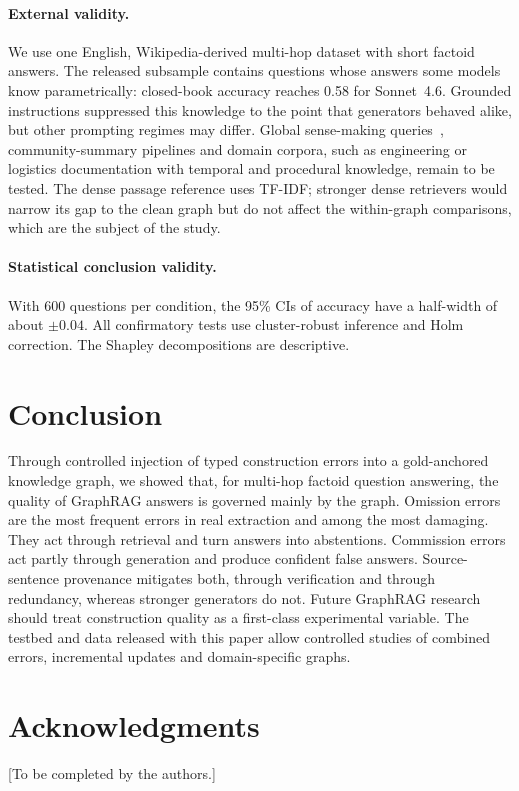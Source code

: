 \documentclass[11pt]{article}
\begin{document}
\paragraph{External validity.} We use one English, Wikipedia-derived multi-hop dataset with short factoid answers. The released subsample contains questions whose answers some models know parametrically: closed-book accuracy reaches 0.58 for Sonnet~4.6. Grounded instructions suppressed this knowledge to the point that generators behaved alike, but other prompting regimes may differ. Global sense-making queries~\cite{edge2024local}, community-summary pipelines and domain corpora, such as engineering or logistics documentation with temporal and procedural knowledge, remain to be tested. The dense passage reference uses TF-IDF; stronger dense retrievers would narrow its gap to the clean graph but do not affect the within-graph comparisons, which are the subject of the study.

\paragraph{Statistical conclusion validity.} With 600 questions per condition, the 95\% CIs of accuracy have a half-width of about $\pm0.04$. All confirmatory tests use cluster-robust inference and Holm correction. The Shapley decompositions are descriptive.

\section{Conclusion}
Through controlled injection of typed construction errors into a gold-anchored knowledge graph, we showed that, for multi-hop factoid question answering, the quality of GraphRAG answers is governed mainly by the graph. Omission errors are the most frequent errors in real extraction and among the most damaging. They act through retrieval and turn answers into abstentions. Commission errors act partly through generation and produce confident false answers. Source-sentence provenance mitigates both, through verification and through redundancy, whereas stronger generators do not. Future GraphRAG research should treat construction quality as a first-class experimental variable. The testbed and data released with this paper allow controlled studies of combined errors, incremental updates and domain-specific graphs.

\section*{Acknowledgments}
[To be completed by the authors.]
\end{document}
